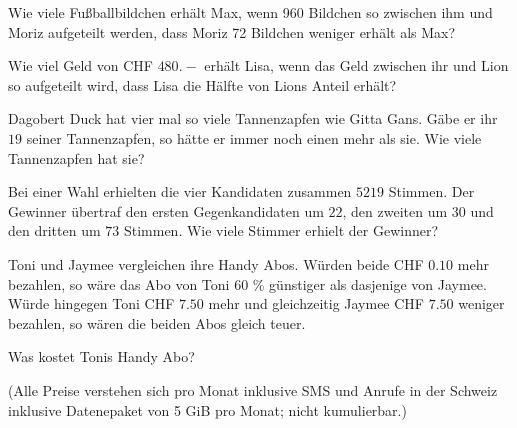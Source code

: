 \begin{bbwAufgabenBlock}
\item Wie viele Fußballbildchen erhält Max, wenn 960 Bildchen so
zwischen ihm und Moriz aufgeteilt werden, dass Moriz 72 Bildchen
weniger erhält als Max?



\item Wie viel Geld von CHF $480.-$ erhält Lisa, wenn das Geld
zwischen ihr und Lion so aufgeteilt wird, dass Lisa die Hälfte von
Lions Anteil erhält?


\item Dagobert Duck hat vier mal so viele Tannenzapfen wie Gitta
Gans. Gäbe er ihr $19$ seiner Tannenzapfen, so hätte er immer noch einen
mehr als sie. Wie viele Tannenzapfen hat sie?


\item Bei einer Wahl erhielten die vier Kandidaten zusammen $5219$
Stimmen. Der Gewinner übertraf den ersten Gegenkandidaten um $22$, den
zweiten um $30$ und den dritten um $73$ Stimmen. Wie viele Stimmer erhielt
der Gewinner?


\noTRAINER{\newpage}

\item Toni und Jaymee vergleichen ihre Handy Abos.
Würden beide CHF $0.10$ mehr bezahlen, so wäre das Abo von Toni 60 \% günstiger als dasjenige von Jaymee.
Würde hingegen Toni CHF $7.50$ mehr und gleichzeitig Jaymee CHF $7.50$ weniger bezahlen, so wären die beiden Abos gleich teuer.

Was kostet Tonis Handy Abo?


{\tiny{(Alle Preise verstehen sich pro Monat inklusive SMS und Anrufe in der Schweiz inklusive Datenepaket von 5 GiB pro Monat; nicht kumulierbar.)}}




\end{bbwAufgabenBlock}


\platzFuerBerechnungenBisEndeSeite{}%
%
